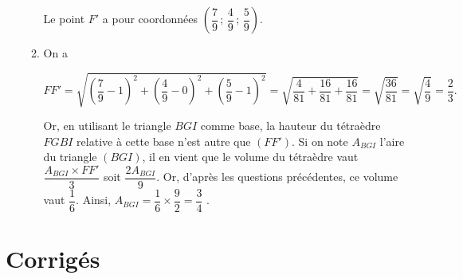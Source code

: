 \documentclass[11pt,fleqn, openany]{book} %
\begin{document}
\begin{solution}
\begin{enumerate}
\begin{enumerate}
Le point $F'$ a pour coordonnées $\left(\dfrac{7}{9} \, ;\, \dfrac{4}{9} \,;\, \dfrac{5}{9}\right)$.
\vskip5pt
\item On a

\[FF' = \sqrt{\left(\dfrac{7}{9}-1\right)^2+\left(\dfrac{4}{9}-0\right)^2 + \left(\dfrac{5}{9}-1\right)^2}=\sqrt{ \dfrac{4}{81}+\dfrac{16}{81}+\dfrac{16}{81}}=\sqrt{\dfrac{36}{81}}=\sqrt{\dfrac{4}{9}}=\dfrac{2}{3}.\]

Or, en utilisant le triangle $BGI$ comme base, la hauteur du tétraèdre $FGBI$ relative à cette base n'est autre que $(FF')$. Si on note $A_{BGI}$ l'aire du triangle $(BGI)$, il en vient que le volume du tétraèdre vaut $\dfrac{A_{BGI} \times FF'}{3}$ soit $\dfrac{2A_{BGI}}{9}$. Or, d'après les questions précédentes, ce volume vaut $\dfrac{1}{6}$. Ainsi, $A_{BGI}= \dfrac{1}{6} \times \dfrac{9}{2} = \dfrac{3}{4}$ .
\end{enumerate} \end{enumerate}\end{solution}


\chapter{Corrigés}


\printsolutions[headings={false} ]
\end{document}
